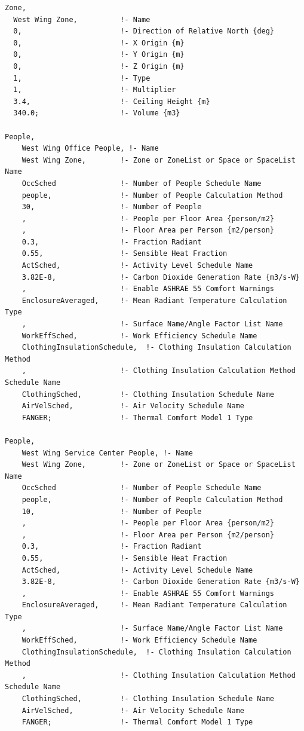 \begin{lstlisting}
Zone,
  West Wing Zone,          !- Name
  0,                       !- Direction of Relative North {deg}
  0,                       !- X Origin {m}
  0,                       !- Y Origin {m}
  0,                       !- Z Origin {m}
  1,                       !- Type
  1,                       !- Multiplier
  3.4,                     !- Ceiling Height {m}
  340.0;                   !- Volume {m3}

People,
    West Wing Office People, !- Name
    West Wing Zone,        !- Zone or ZoneList or Space or SpaceList Name
    OccSched               !- Number of People Schedule Name
    people,                !- Number of People Calculation Method
    30,                    !- Number of People
    ,                      !- People per Floor Area {person/m2}
    ,                      !- Floor Area per Person {m2/person}
    0.3,                   !- Fraction Radiant
    0.55,                  !- Sensible Heat Fraction
    ActSched,              !- Activity Level Schedule Name
    3.82E-8,               !- Carbon Dioxide Generation Rate {m3/s-W}
    ,                      !- Enable ASHRAE 55 Comfort Warnings
    EnclosureAveraged,     !- Mean Radiant Temperature Calculation Type
    ,                      !- Surface Name/Angle Factor List Name
    WorkEffSched,          !- Work Efficiency Schedule Name
    ClothingInsulationSchedule,  !- Clothing Insulation Calculation Method
    ,                      !- Clothing Insulation Calculation Method Schedule Name
    ClothingSched,         !- Clothing Insulation Schedule Name
    AirVelSched,           !- Air Velocity Schedule Name
    FANGER;                !- Thermal Comfort Model 1 Type

People,
    West Wing Service Center People, !- Name
    West Wing Zone,        !- Zone or ZoneList or Space or SpaceList Name
    OccSched               !- Number of People Schedule Name
    people,                !- Number of People Calculation Method
    10,                    !- Number of People
    ,                      !- People per Floor Area {person/m2}
    ,                      !- Floor Area per Person {m2/person}
    0.3,                   !- Fraction Radiant
    0.55,                  !- Sensible Heat Fraction
    ActSched,              !- Activity Level Schedule Name
    3.82E-8,               !- Carbon Dioxide Generation Rate {m3/s-W}
    ,                      !- Enable ASHRAE 55 Comfort Warnings
    EnclosureAveraged,     !- Mean Radiant Temperature Calculation Type
    ,                      !- Surface Name/Angle Factor List Name
    WorkEffSched,          !- Work Efficiency Schedule Name
    ClothingInsulationSchedule,  !- Clothing Insulation Calculation Method
    ,                      !- Clothing Insulation Calculation Method Schedule Name
    ClothingSched,         !- Clothing Insulation Schedule Name
    AirVelSched,           !- Air Velocity Schedule Name
    FANGER;                !- Thermal Comfort Model 1 Type


\end{lstlisting}
